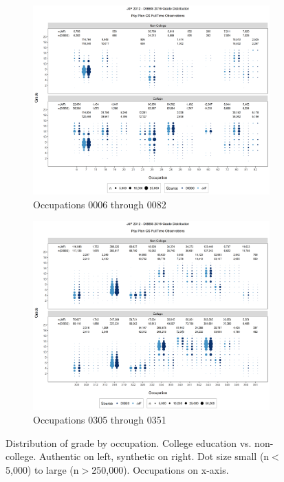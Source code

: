 \documentclass[10pt, letterpaper]{article}
\begin{document}
\begin{spacing}{1.0}
\clearpage

\begin{figure}[]
    \centering
    \begin{subfigure}{1\textwidth}
        \centering
        \includegraphics[width=6in, trim={0 200px 0 165px}, clip]{JdFDIBBSGSFullTimeGradeCollegeOccupation1.png}
        \caption{Occupations 0006 through 0082}
        \vspace{20pt}
    \end{subfigure}
    \begin{subfigure}{1\textwidth}
        \centering
        \includegraphics[width=6in, trim={0 200px 0 165px}, clip]{JdFDIBBSGSFullTimeGradeCollegeOccupation81.png}
        \caption{Occupations 0305 through 0351}
        \vspace{10pt}
    \end{subfigure}
    \caption{Distribution of grade by occupation.  College education vs. non-college.  Authentic on left, synthetic on right.  Dot size small (n$<$5,000) to large (n$>$250,000).  Occupations on x-axis.}
    \label{figure:JdFDIBBSGSFullTimeGradeCollegeOccupation}
\end{figure}


\end{spacing}
\end{document}
